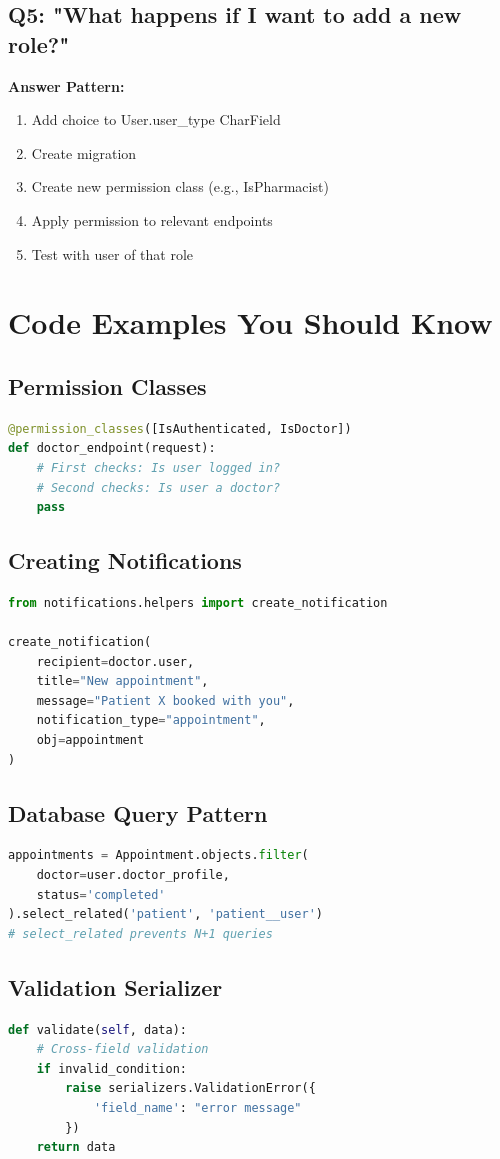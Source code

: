 \documentclass[11pt,a4paper,twoside]{report}
\begin{document}
\subsection*{Q5: "What happens if I want to add a new role?"}

\textbf{Answer Pattern:}
\begin{enumerate}
    \item Add choice to User.user\_type CharField
    \item Create migration
    \item Create new permission class (e.g., IsPharmacist)
    \item Apply permission to relevant endpoints
    \item Test with user of that role
\end{enumerate}

\section*{Code Examples You Should Know}

\subsection*{Permission Classes}
\begin{lstlisting}[language=Python]
@permission_classes([IsAuthenticated, IsDoctor])
def doctor_endpoint(request):
    # First checks: Is user logged in?
    # Second checks: Is user a doctor?
    pass
\end{lstlisting}

\subsection*{Creating Notifications}
\begin{lstlisting}[language=Python]
from notifications.helpers import create_notification

create_notification(
    recipient=doctor.user,
    title="New appointment",
    message="Patient X booked with you",
    notification_type="appointment",
    obj=appointment
)
\end{lstlisting}

\subsection*{Database Query Pattern}
\begin{lstlisting}[language=Python]
appointments = Appointment.objects.filter(
    doctor=user.doctor_profile,
    status='completed'
).select_related('patient', 'patient__user')
# select_related prevents N+1 queries
\end{lstlisting}

\subsection*{Validation Serializer}
\begin{lstlisting}[language=Python]
def validate(self, data):
    # Cross-field validation
    if invalid_condition:
        raise serializers.ValidationError({
            'field_name': "error message"
        })
    return data
\end{lstlisting}
\end{document}
